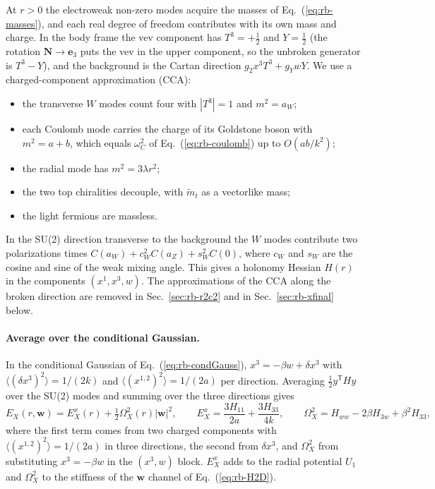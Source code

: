 At $r>0$ the electroweak non-zero modes acquire the masses of Eq.~(\ref{eq:rb-masses}), and each real degree of freedom contributes with its own mass and charge.
In the body frame the vev component has $T^3=+\frac12$ and $Y=\frac12$ (the rotation $\bm N\to\bm e_3$ puts the vev in the upper component, so the unbroken generator is $T^3-Y$), and the background is the Cartan direction $g_2x^3T^3+g_YwY$.
We use a charged-component approximation (CCA):
\begin{itemize}
\item the transverse $W$ modes count four with $|T^3|=1$ and $m^2=a_W$;
\item each Coulomb mode carries the charge of its Goldstone boson with $m^2=a+b$, which equals $\omega_C^2$ of Eq.~(\ref{eq:rb-coulomb}) up to $O(ab/k^2)$;
\item the radial mode has $m^2=3\lambda r^2$;
\item the two top chiralities decouple, with $\tilde m_t$ as a vectorlike mass;
\item the light fermions are massless.
\end{itemize}
In the SU(2) direction transverse to the background the $W$ modes contribute two polarizations times $C(a_W)+c_W^2C(a_Z)+s_W^2C(0)$, where $c_W$ and $s_W$ are the cosine and sine of the weak mixing angle.
This gives a holonomy Hessian $H(r)$ in the components $(x^1,x^3,w)$.
The approximations of the CCA along the broken direction are removed in Sec.~\ref{sec:rb-r2c2} and in Sec.~\ref{sec:rb-xfinal} below.

\paragraph{Average over the conditional Gaussian.}
In the conditional Gaussian of Eq.~(\ref{eq:rb-condGauss}), $x^3=-\beta w+\delta x^3$ with $\langle(\delta x^3)^2\rangle=1/(2k)$ and $\langle(x^{1,2})^2\rangle=1/(2a)$ per direction.
Averaging $\frac12y^{\mathsf T}Hy$ over the SU(2) modes and summing over the three directions gives
\begin{equation}
E_X(r,\bm w)=E_X^x(r)+\tfrac12\Omega_X^2(r)|\bm w|^2,\qquad
E_X^x=\frac{3H_{11}}{2a}+\frac{3H_{33}}{4k},\qquad
\Omega_X^2=H_{ww}-2\beta H_{3w}+\beta^2H_{33},
\label{eq:rb-EX}
\end{equation}
where the first term comes from two charged components with $\langle(x^{1,2})^2\rangle=1/(2a)$ in three directions, the second from $\delta x^3$, and $\Omega_X^2$ from substituting $x^3=-\beta w$ in the $(x^3,w)$ block.
$E_X^x$ adds to the radial potential $U_1$ and $\Omega_X^2$ to the stiffness of the $\bm w$ channel of Eq.~(\ref{eq:rb-H2D}).

